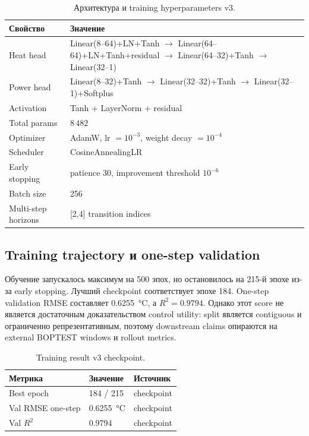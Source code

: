 \documentclass[12pt,a4paper]{article}
\begin{document}
\begin{table}[htbp]
\centering
\caption{Архитектура и training hyperparameters v3.}
\label{tab:v3-arch}
\begin{tabular}{ll}
\toprule
Свойство & Значение \\
\midrule
Heat head & Linear(8--64)+LN+Tanh \(\rightarrow\) Linear(64--64)+LN+Tanh+residual \(\rightarrow\) Linear(64--32)+Tanh \(\rightarrow\) Linear(32--1) \\
Power head & Linear(8--32)+Tanh \(\rightarrow\) Linear(32--32)+Tanh \(\rightarrow\) Linear(32--1)+Softplus \\
Activation & Tanh + LayerNorm + residual \\
Total params & \(8\,482\) \\
Optimizer & AdamW, lr \(=10^{-3}\), weight decay \(=10^{-4}\) \\
Scheduler & CosineAnnealingLR \\
Early stopping & patience 30, improvement threshold \(10^{-6}\) \\
Batch size & 256 \\
Multi-step horizons & [2,4] transition indices \\
\bottomrule
\end{tabular}
\end{table}

\subsection{Training trajectory и one-step validation}

Обучение запускалось максимум на 500 эпох, но остановилось на 215-й эпохе из-за early stopping. Лучший checkpoint соответствует эпохе 184. One-step validation RMSE составляет \SI{0.6255}{\celsius}, а \(R^2=0.9794\). Однако этот score не является достаточным доказательством control utility: split является contiguous и ограниченно репрезентативным, поэтому downstream claims опираются на external BOPTEST windows и rollout metrics.

\begin{table}[htbp]
\centering
\caption{Training result v3 checkpoint.}
\label{tab:v3-training}
\begin{tabular}{lll}
\toprule
Метрика & Значение & Источник \\
\midrule
Best epoch & 184 / 215 & checkpoint \\
Val RMSE one-step & \SI{0.6255}{\celsius} & checkpoint \\
Val \(R^2\) & 0.9794 & checkpoint \\
\bottomrule
\end{tabular}
\end{table}
\end{document}
